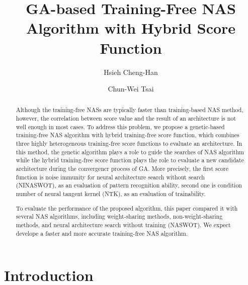 \documentclass[sigconf]{acmart}
\begin{document}
\title{GA-based Training-Free NAS Algorithm with Hybrid Score Function}

\author{Hsieh Cheng-Han}

\author{Chun-Wei Tsai}

\begin{abstract}

    Although the training-free NASs are typically faster than training-based 
    NAS method, however, the correlation between score value and the result 
    of an architecture is not well enough in most cases.
    To address this problem, we propose a genetic-based training-free NAS 
    algorithm with hybrid training-free score function, which combines three 
    highly heterogeneous training-free score functions to evaluate an architecture. 
    In this method, the genetic algorithm plays a role to guide the searches 
    of NAS algorithm while the hybrid training-free score function plays the 
    role to evaluate a new candidate architecture during the convergencr process 
    of GA. More precisely, the first score function is noise immunity for 
    neural architecture search without search (NINASWOT), as an evaluation of 
    pattern recognition ability, second one is condition number of neural 
    tangent kernel (NTK), as an evaluation of trainability.
    
    To evaluate the performance of the proposed algorithm, this paper compared 
    it with several NAS algorithms, including weight-sharing methods, 
    non-weight-sharing methods, and neural architecture search without training (NASWOT). 
    We expect develope a faster and more accurate training-free NAS algorithm.

\end{abstract}
\maketitle

\section{Introduction}
\label{sec:introduction}
\end{document}
